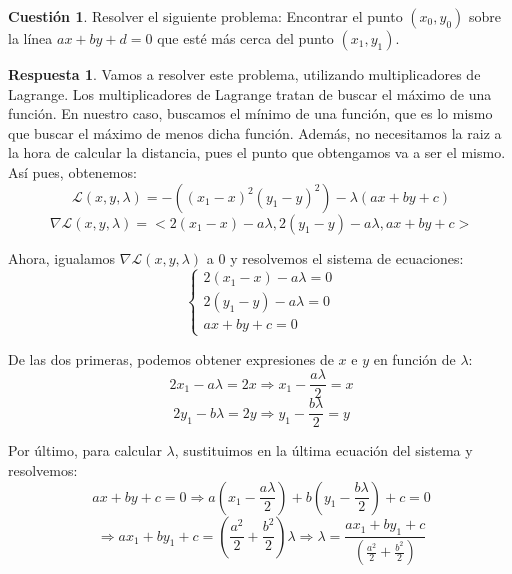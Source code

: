 \documentclass[10pt,a4paper]{article}
\theoremstyle{definition}
\newtheorem{cuestion}{Cuestión}
\newtheorem*{respuesta}{Respuesta}
\begin{document}
\begin{cuestion}
Resolver el siguiente problema: Encontrar el punto $(x_0,y_0)$ sobre la línea $ax+by+d=0$ que esté más cerca del punto $(x_1,y_1)$.
\end{cuestion}
\begin{respuesta}
Vamos a resolver este problema, utilizando multiplicadores de Lagrange. Los multiplicadores de Lagrange tratan de buscar el máximo de una función. En nuestro caso, buscamos el mínimo de una función, que es lo mismo que buscar el máximo de menos dicha función. Además, no necesitamos la raiz a la hora de calcular la distancia, pues el punto que obtengamos va a ser el mismo. Así pues, obtenemos:
\[
\ \mathcal{L}(x,y,\lambda) = -\left((x_1-x)^2(y_1-y)^2\right)-\lambda(ax+by+c)
\]
\[
\ \nabla \mathcal{L}(x,y,\lambda) = < 2(x_1-x)-a\lambda,2(y_1-y)-a\lambda, ax+by+c>
\]

Ahora, igualamos $\nabla \mathcal{L}(x,y,\lambda)$ a 0 y resolvemos el sistema de ecuaciones:
\[
\ \begin{cases} 2(x_1-x)-a\lambda=0 \\ 2(y_1-y)-a\lambda=0 \\ ax+by+c =0 \end{cases}
\]

De las dos primeras, podemos obtener expresiones de $x$ e $y$ en función de $\lambda$:
\[
\ 2x_1-a\lambda = 2x \Rightarrow x_1-\frac{a\lambda}{2} = x
\]
\[
\ 2y_1-b\lambda = 2y \Rightarrow y_1-\frac{b\lambda}{2} = y
\]

Por último, para calcular $\lambda$, sustituimos en la última ecuación del sistema y resolvemos:
\[
\ ax+by+c =0\Rightarrow a\left(x_1-\frac{a\lambda}{2}\right)+b\left(y_1-\frac{b\lambda}{2}\right)+c = 0
\]
\[
\ \Rightarrow ax_1+by_1+c = \left(\frac{a^2}{2}+\frac{b^2}{2}\right)\lambda \Rightarrow \lambda = \frac{ax_1+by_1+c }{\left(\frac{a^2}{2}+\frac{b^2}{2}\right)}
\]
\end{respuesta}
\end{document}
